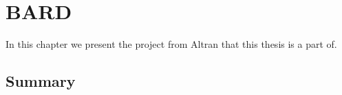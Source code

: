 %

\acresetall

\chapter{BARD}
\label{ch:BARD}


In this chapter we present the project from Altran that this thesis is a part of.









  
\section{Summary}
\label{sec:SummaryBARD}



